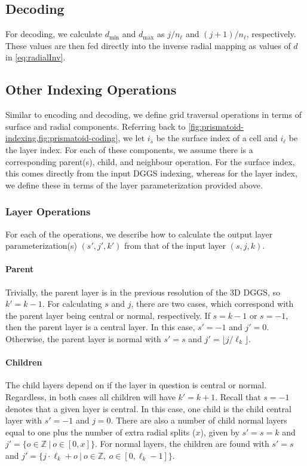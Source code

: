 \subsection{Decoding}
For decoding, we calculate $d_\mathrm{min}$ and $d_\mathrm{max}$ as $j/n_\ell$ and $(j+1)/n_\ell$, respectively.
These values are then fed directly into the inverse radial mapping as values of $d$ in \cref{eq:radialInv}.


\subsection{Other Indexing Operations}
Similar to encoding and decoding, we define grid traversal operations in terms of surface and radial components.
Referring back to \cref{fig:prismatoid-indexing,fig:prismatoid-coding}, we let $i_s$ be the surface index of a cell and $i_\ell$ be the layer index.
For each of these components, we assume there is a corresponding parent(s), child, and neighbour operation.
For the surface index, this comes directly from the input DGGS indexing, whereas for the layer index, we define these in terms of the layer parameterization provided above.


\subsubsection{Layer Operations}
For each of the operations, we describe how to calculate the output layer parameterization(s) $(s',j',k')$ from that of the input layer $(s,j,k)$.


\paragraph{Parent}
Trivially, the parent layer is in the previous resolution of the 3D DGGS, so $k' = k - 1$.
For calculating $s$ and $j$, there are two cases, which correspond with the parent layer being central or normal, respectively.
If $s = k-1$ or $s = -1$, then the parent layer is a central layer. In this case, $s' = -1$ and $j' = 0$.
Otherwise, the parent layer is normal with $s' = s$ and $j' = \lfloor j / \ell_k \rfloor$.


\paragraph{Children}
The child layers depend on if the layer in question is central or normal.
Regardless, in both cases all children will have $k' = k + 1$.
Recall that $s = -1$ denotes that a given layer is central.
In this case, one child is the child central layer with $s' = -1$ and $j = 0$.
There are also a number of child normal layers equal to one plus the number of extra radial splits ($x$), given by $s' = s = k$ and $j' = \{ o \in \mathbb{Z} \ | \ o \in [0, x] \}$.
For normal layers, the children are found with $s' = s$ and $j' = \{ j \cdot \ell_k + o \ | \  o \in \mathbb{Z}, \ o \in [0, \ell_k - 1] \}$.


